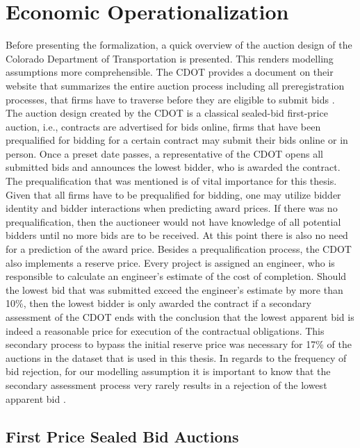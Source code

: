 \documentclass[a4paper,12pt, headsepline]{scrartcl}
\numberwithin{equation}{section}
\begin{document}
\section{Economic Operationalization}\label{sec:op}

Before presenting the formalization, a quick overview of the auction design of the Colorado Department of Transportation is presented. This renders modelling assumptions more comprehensible. The CDOT provides a document on their website that summarizes the entire auction process including all preregistration processes, that firms have to traverse before they are eligible to submit bids \citep{CDOTRul}.\\
The auction design created by the CDOT is a classical sealed-bid first-price auction, i.e., contracts are advertised for bids online, firms that have been prequalified for bidding for a certain contract may submit their bids online or in person. Once a preset date passes, a representative of the CDOT opens all submitted bids and announces the lowest bidder, who is awarded the contract. The prequalification that was mentioned is of vital importance for this thesis. Given that all firms have to be prequalified for bidding, one may utilize bidder identity and bidder interactions when predicting award prices. If there was no prequalification, then the auctioneer would not have knowledge of all potential bidders until no more bids are to be received. At this point there is also no need for a prediction of the award price. Besides a prequalification process, the CDOT also implements a reserve price. Every project is assigned an engineer, who is responsible to calculate an engineer's estimate of the cost of completion. Should the lowest bid that was submitted exceed the engineer's estimate by more than 10\%, then the lowest bidder is only awarded the contract if a secondary assessment of the CDOT ends with the conclusion that the lowest apparent bid is indeed a reasonable price for execution of the contractual obligations. This secondary process to bypass the initial reserve price was necessary for 17\% of the auctions in the dataset that is used in this thesis. In regards to the frequency of bid rejection, for our modelling assumption it is important to know that the secondary assessment process very rarely results in a rejection of the lowest apparent bid \citep{CDOTRul}. 

\subsection{First Price Sealed Bid Auctions}\label{subsec:fpsba}
\end{document}
